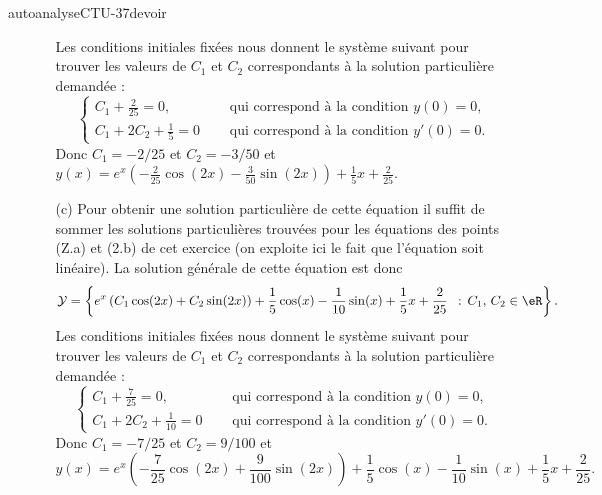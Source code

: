 \begin{corrige}{autoanalyseCTU-37devoir}
\begin{enumerate}
\begin{enumerate}
Les conditions initiales fixées nous donnent le système suivant pour trouver les valeurs de $C_1$ et $C_2$ correspondants à la solution particulière demandée :
\begin{equation*}
  \begin{cases}
    C_1+\frac{2}{25}= 0,  & \quad\text{ qui correspond à la condition }y(0)=0,\\
    C_1+2C_2+\frac{1}{5} = 0 & \quad\text{ qui correspond à la condition }y'(0)=0.
  \end{cases}
\end{equation*}
Donc $C_1= -2/25$ et $C_2 = -3/50$ et $y(x) = e^{x}\left(-\frac{2}{25}\cos(2x) -\frac{3}{50}\sin(2x)\right)+ \frac{1}{5}x+\frac{2}{25}$.
  \item[(c)] Pour obtenir une solution particulière de cette équation il suffit de sommer les solutions particulières trouvées pour les équations des points (Z.a) et (2.b) de cet exercice (on exploite ici le fait que l'équation soit linéaire). La solution générale de cette équation est donc 
 \begin{equation*}
  \mathcal{Y} = \left\{ e^{x}\left(C_1\cos(2x) +C_2\sin(2x)\right)+ \frac{1}{5} \cos(x) -\frac{1}{10}\sin(x)+\frac{1}{5}x +\frac{2}{25} \ \,:\, C_1,\, C_2 \in \eR \right\}.
\end{equation*}
Les conditions initiales fixées nous donnent le système suivant pour trouver les valeurs de $C_1$ et $C_2$ correspondants à la solution particulière demandée :
\begin{equation*}
  \begin{cases}
    C_1+\frac{7}{25}= 0,  & \quad\text{ qui correspond à la condition }y(0)=0,\\
    C_1+2C_2+\frac{1}{10} = 0 & \quad\text{ qui correspond à la condition }y'(0)=0.
  \end{cases}
\end{equation*}
Donc $C_1= -7/25$ et $C_2 = 9/100$ et 
\[y(x) = e^{x}\left(-\frac{7}{25}\cos(2x) +\frac{9}{100}\sin(2x)\right)+ \frac{1}{5} \cos(x) -\frac{1}{10}\sin(x)+ \frac{1}{5}x+\frac{2}{25}.
\]
  \end{enumerate}
  \end{enumerate}

\end{corrige}   
